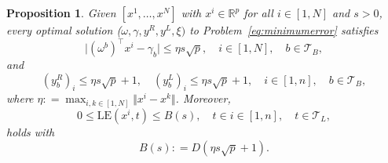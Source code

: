 \documentclass[a4paper,american,reqno]{amsart}
\newtheorem{prop}{Proposition}
\newcommand{\define}{\mathrel{{\mathop:}{=}}}
\newcommand{\LE}{\text{LE}}
\begin{document}
\begin{prop}
  \label{boundhiperprop}
  Given $[x^1, \dots, x^N]$ with $x^i \in \mathbb{R}^p$ for all $i
  \in [1,N]$ and $s > 0$, every optimal solution ($\omega,
  \gamma,y^{R},y^{L},\xi)$ to Problem~\eqref{eq:minimumerror}
  satisfies
  \begin{equation*}\label{boundhiper*}
    \vert (\omega^b)^\top x^i - \gamma_b \vert \leq \eta s \sqrt{p},
    \quad i \in [1,N], \quad b \in  \mathcal{T}_B,
  \end{equation*}
  and
  \begin{equation*}
    (y_b^R)_i \leq \eta s \sqrt{p} +1, \quad (y_b^L)_i \leq \eta s
    \sqrt{p} +1, \quad  i \in [1,n], \quad b \in  \mathcal{T}_B,
  \end{equation*}
  where
  $\eta \define \max_{i,k \in [1,N]} \Vert x^i -x^k \Vert$.
  Moreover,
  \begin{equation*}
    0 \leq \LE(x^i, t) \leq  B(s), \quad t \in i \in [1,n], \quad t \in  \mathcal{T}_L,
  \end{equation*}
  holds with
  \begin{equation}
    \label{boundLE}
    B(s) \define D(\eta s \sqrt{p} +1).
  \end{equation}
\end{prop}
\end{document}
